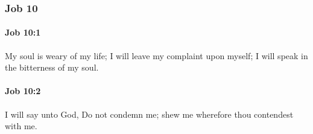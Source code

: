 	\subsubsection{Job 10} %
		\label{JOB-10}

		\paragraph{Job 10:1} %
			\label{JOB-10-1}

			My soul is weary of my life; I will leave my complaint upon myself; I will speak in the bitterness of my soul.


		\paragraph{Job 10:2} %
			\label{JOB-10-2}

			I will say unto God, Do not condemn me; shew me wherefore thou contendest with me.


